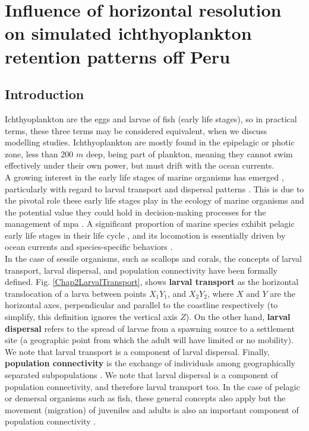 \chapter{Influence of horizontal resolution on simulated ichthyoplankton retention patterns off Peru}\label{Chap2}

\clearpage
\section{Introduction}\label{Chap2Intro}

Ichthyoplankton are the eggs and larvae of fish (early life stages), so in practical terms, these three terms may be considered equivalent, when we discuss modelling studies. Ichthyoplankton are mostly found in the epipelagic or photic zone, less than 200 $m$ deep, being part of plankton, meaning they cannot swim effectively under their own power, but must drift with the ocean currents.\\

A growing interest in the early life stages of marine organisms has emerged \citep{Stra1993,Have1995,Levi2006,GawaMoni2007,CoweSpon2009}, particularly with regard to larval transport and dispersal patterns \citep{Youn1995,GreeMayp2015,Leis2021}. This is due to the pivotal role these early life stages play in the ecology of marine organisms \citep{MoseSmit1993} and the potential value they could hold in decision-making processes for the management of \acrfull{mpa} \citep{DaloBogd2015}. A significant proportion of marine species exhibit pelagic early life stages in their life cycle \citep{Have1995}, and its locomotion is essentially driven by ocean currents and species-specific behaviors \citep{Levi1990,CowePari2006,DaloBogd2015}.\\

In the case of sessile organisms, such as scallops and corals, the concepts of larval transport, larval dispersal, and population connectivity have been formally defined. Fig. \ref{Chap2LarvalTransport}, shows \textbf{larval transport} as the horizontal translocation of a larva between points $X_{1}Y_{1}$, and $X_{2}Y_{2}$, where $X$ and $Y$ are the horizontal axes, perpendicular and parallel to the coastline respectively (to simplify, this definition ignores the vertical axis $Z$). On the other hand, \textbf{larval dispersal} refers to the spread of larvae from a spawning source to a settlement site (a geographic point from which the adult will have limited or no mobility). We note that larval transport is a component of larval dispersal. Finally, \textbf{population connectivity} is the exchange of individuals among geographically separated subpopulations \citep{PineHare2007}. We note that larval dispersal is a component of population connectivity, and therefore larval transport too. In the case of pelagic or demersal organisms such as fish, these general concepts also apply but the movement (migration) of juveniles and adults is also an important component of population connectivity \citep{NordJoha2011,CaloFeli2013,PanYe2020}.\\

